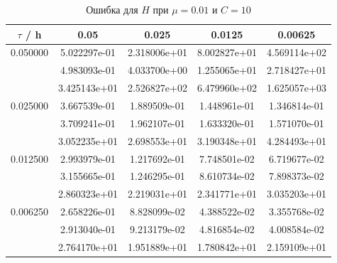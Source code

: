 \documentclass[specialist,subf,href,colorlinks=true,12pt
,times,mtpro,specialist
]{disser}
\begin{document}
\begin{table}[H]
\small
\caption{Ошибка для $H$ при $\mu=0.01$ и $C = 10$}
\begin{center}
\begin{tabular}{|c|c|c|c|c|}
\hline
$\tau$ / h & 0.05 & 0.025 & 0.0125 & 0.00625 \\
\hline
0.050000 & 5.022297e-01  & 2.318006e+01  & 8.002827e+01  & 4.569114e+02 \\
 & 4.983093e-01  & 4.033700e+00  & 1.255065e+01  & 2.718427e+01 \\
 & 3.425143e+01  & 2.526827e+02  & 6.479960e+02  & 1.625057e+03 \\
\hline
0.025000 & 3.667539e-01  & 1.889509e-01  & 1.448961e-01  & 1.346814e-01 \\
 & 3.709241e-01  & 1.962107e-01  & 1.633320e-01  & 1.571070e-01 \\
 & 3.052235e+01  & 2.698553e+01  & 3.190348e+01  & 4.284493e+01 \\
\hline
0.012500 & 2.993979e-01  & 1.217692e-01  & 7.748501e-02  & 6.719677e-02 \\
 & 3.155665e-01  & 1.246295e-01  & 8.610734e-02  & 7.898373e-02 \\
 & 2.860323e+01  & 2.219031e+01  & 2.341771e+01  & 3.035203e+01 \\
\hline
0.006250 & 2.658226e-01  & 8.828099e-02  & 4.388522e-02  & 3.355768e-02 \\
 & 2.913040e-01  & 9.213179e-02  & 4.816854e-02  & 4.008584e-02 \\
 & 2.764170e+01  & 1.951889e+01  & 1.780842e+01  & 2.159109e+01 \\
\hline
\end{tabular}
\end{center}
\end{table}
\end{document}
